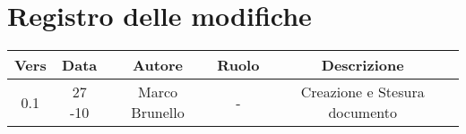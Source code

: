 \section{Registro delle modifiche}

\begin{table}[htbp]
	\begin{tabular}{|c|c|c|c|c|}
		\hline
		\rowcolor[gray]{0.9}
		Vers & Data & Autore & Ruolo & Descrizione \\
		\hline
		0.1 & 27 -10 & Marco Brunello & - & Creazione e Stesura documento\\
                    \hline
	\end{tabular}
\end{table}